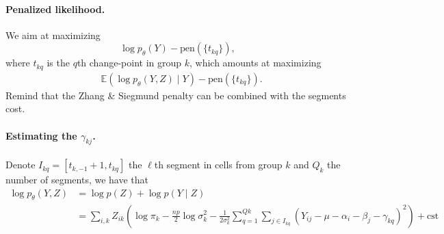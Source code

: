 \documentclass[a4paper, 11pt]{article}
\newcommand{\cst}{\text{cst}}
\newcommand{\Esp}{\mathbb{E}}
\begin{document}
\paragraph{Penalized likelihood.}
We aim at maximizing
$$
\log p_\theta(Y) - \text{pen}(\{t_{kq}\}),
$$
where $t_{kq}$ is the $q$th change-point in group $k$, which amounts at maximizing
\begin{align*}
 & \Esp \left(\log p_\theta(Y, Z)  \mid Y\right) - \text{pen}(\{t_{kq}\}).
\end{align*}
Remind that the Zhang \& Siegmund penalty can be combined with the segments cost.

\paragraph{Estimating the $\gamma_{kj}$.} Denote $I_{kq} = [t_{k, -1}+1, t_{kq}]$ the $\ell$th segment in cells from group $k$ and $Q_k$ the number of segments, we have that
\begin{align*}
  \log p_\theta(Y, Z)
  & = \log p(Z) + \log p(Y \mid Z) \\
  & = \sum_{i, k} Z_{ik} \left(\log \pi_k - \frac{np}2 \log \sigma_k^2 - \frac1{2\sigma_k^2} \sum_{q=1}^{Qk} \sum_{j \in I_{kq}} (Y_{ij} - \mu - \alpha_i - \beta_j - \gamma_{kq})^2 \right) + \cst
\end{align*}
  
\end{document}
